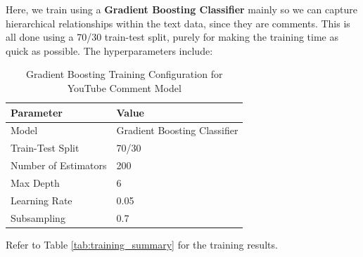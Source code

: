 \documentclass{article}
\begin{document}
Here, we train using a \textbf{Gradient Boosting Classifier} mainly so we can capture hierarchical relationships within the text data, since they are comments. This is all done using a 70/30 train-test split, purely for making the training time as quick as possible. The hyperparameters include:

\begin{table}[h!]
    \centering
    \renewcommand{\arraystretch}{1.2}
    \setlength{\tabcolsep}{11pt}
    \begin{tabular}{|l|l|}
        \hline
        \textbf{Parameter} & \textbf{Value} \\
        \hline
        Model & Gradient Boosting Classifier \\
        \hline
        Train-Test Split & 70/30 \\
        \hline
        Number of Estimators & 200 \\
        \hline
        Max Depth & 6 \\
        \hline
        Learning Rate & 0.05 \\
        \hline
        Subsampling & 0.7 \\
        \hline
    \end{tabular}
    \caption{Gradient Boosting Training Configuration for YouTube Comment Model}
\end{table}

\newpage

\noindent
Refer to Table \ref{tab:training_summary} for the training results.


\end{document}
